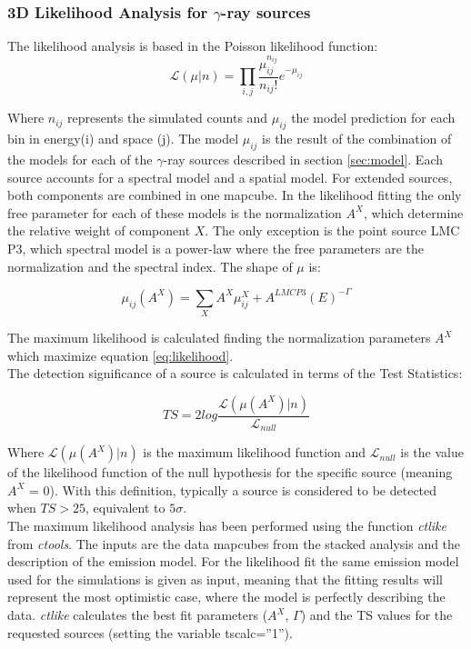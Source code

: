\documentclass[main.tex]{subfiles}
\begin{document}
\subsubsection{3D Likelihood Analysis for $\gamma$-ray sources}

The likelihood analysis is based in the Poisson likelihood function:
\begin{equation}
  \mathcal{L}(\mu | n) = \prod_{i,j}\frac{\mu_{ij}^{n_{ij}}}{n_{ij}!}e^{-\mu_{ij}}
  \label{eq:likelihood}
\end{equation}

Where $n_{ij}$ represents the simulated counts and $\mu_{ij}$ the model prediction for each bin in energy(i) and space (j). The model $\mu_{ij}$ is the result of the combination of the models for each of the $\gamma$-ray sources described in section \ref{sec:model}. Each source accounts for a spectral model and a spatial model. For extended sources, both components are combined in one mapcube. In the likelihood fitting the only free parameter for each of these models is the normalization $A^{X}$, which determine the relative weight of component $X$. The only exception is the point source LMC P3, which spectral model is a power-law where the free parameters are the normalization and the spectral index. The shape of $\mu$ is:

\begin{equation}
  \mu_{ij}(A^{X}) = \sum_{X} A^{X} \mu^{X}_{ij} + A^{LMC P3}(E)^{-\Gamma}
\end{equation}

The maximum likelihood is calculated finding the normalization parameters $A^{X}$ which maximize equation \ref{eq:likelihood}.\\
The detection significance of a source is calculated in terms of the Test Statistics:

\begin{equation}
  TS = 2log \frac{\mathcal{L}(\mu(A^{X})|n)}{\mathcal{L}_{null}}
  \label{eq:ts}
\end{equation}

Where $\mathcal{L}(\mu(A^{X})|n)$ is the maximum likelihood function and $\mathcal{L}_{null}$ is the value of the likelihood function of the null hypothesis for the specific source (meaning $A^X$ = 0). With this definition, typically a source is considered to be detected when $TS>25$, equivalent to $5\sigma$.\\
The maximum likelihood analysis has been performed using the function \textit{ctlike} from \textit{ctools}. The inputs are the data mapcubes from the stacked analysis and the description of the emission model. For the likelihood fit the same emission model used for the simulations is given as input, meaning that the fitting results will represent the most optimistic case, where the model is perfectly describing the data. \textit{ctlike} calculates the best fit parameters ($A^X$, $\Gamma$) and the TS values for the requested sources (setting the variable tscalc=''1'').
\end{document}
